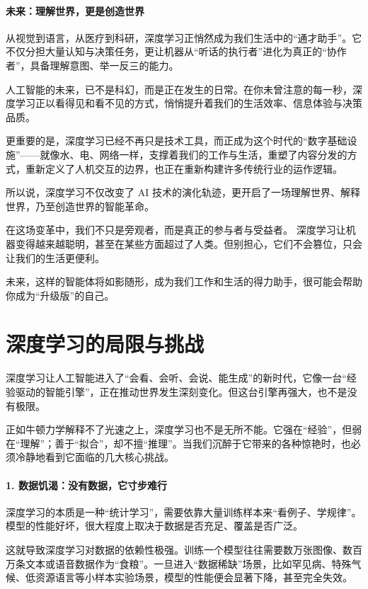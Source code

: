 \paragraph{未来：理解世界，更是创造世界}

从视觉到语言，从医疗到科研，深度学习正悄然成为我们生活中的“通才助手”。它不仅分担大量认知与决策任务，更让机器从“听话的执行者”进化为真正的“协作者”，具备理解意图、举一反三的能力。

人工智能的未来，已不是科幻，而是正在发生的日常。在你未曾注意的每一秒，深度学习正以看得见和看不见的方式，悄悄提升着我们的生活效率、信息体验与决策品质。

更重要的是，深度学习已经不再只是技术工具，而正成为这个时代的“数字基础设施”——就像水、电、网络一样，支撑着我们的工作与生活，重塑了内容分发的方式，重新定义了人机交互的边界，也正在重新构建许多传统行业的运作逻辑。

所以说，深度学习不仅改变了 AI 技术的演化轨迹，更开启了一场理解世界、解释世界，乃至创造世界的智能革命。

在这场变革中，我们不只是旁观者，而是真正的参与者与受益者。
深度学习让机器变得越来越聪明，甚至在某些方面超过了人类。但别担心，它们不会篡位，只会让我们的生活更便利。

未来，这样的智能体将如影随形，成为我们工作和生活的得力助手，很可能会帮助你成为“升级版”的自己。

 \section{深度学习的局限与挑战}  

深度学习让人工智能进入了“会看、会听、会说、能生成”的新时代，它像一台“经验驱动的智能引擎”，正在推动世界发生深刻变化。但这台引擎再强大，也不是没有极限。

正如牛顿力学解释不了光速之上，深度学习也不是无所不能。它强在“经验”，但弱在“理解”；善于“拟合”，却不擅“推理”。当我们沉醉于它带来的各种惊艳时，也必须冷静地看到它面临的几大核心挑战。

\paragraph*{1. 数据饥渴：没有数据，它寸步难行}

深度学习的本质是一种“统计学习”，需要依靠大量训练样本来“看例子、学规律”。模型的性能好坏，很大程度上取决于数据是否充足、覆盖是否广泛。

这就导致深度学习对数据的依赖性极强。训练一个模型往往需要数万张图像、数百万条文本或语音数据作为“食粮”。一旦进入“数据稀缺”场景，比如罕见病、特殊气候、低资源语言等小样本实验场景，模型的性能便会显著下降，甚至完全失效。

